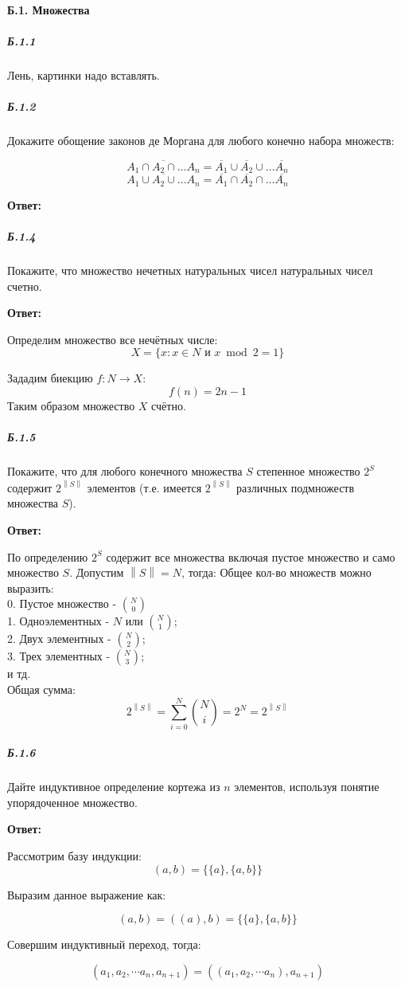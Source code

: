 \paragraph{Б.1. Множества}
\subparagraph{Б.1.1}
Лень, картинки надо вставлять.

\subparagraph{Б.1.2}

Докажите обощение законов де Моргана для любого конечно набора множеств:

\[
\overline{A_1 \cap A_2 \cap \ldots A_n } = \overline{A_1} \cup \overline{A_2} \cup \ldots \overline{A_n }
\]
\[
\overline{A_1 \cup A_2 \cup \ldots A_n } = \overline{A_1} \cap \overline{A_2} \cap \ldots \overline{A_n }
\]

\textbf{Ответ:}



\subparagraph{Б.1.4}

Покажите, что множество нечетных натуральных чисел натуральных чисел счетно.

\textbf{Ответ:}

Определим множество все нечётных числе:
\[
X = \{ x : x \in N  \text{ и } x \bmod 2 = 1 \}
\]

Зададим биекцию $f : N \rightarrow X$:
\[
f(n) = 2n - 1
\]
Таким образом множество $X$ счётно.

\subparagraph{Б.1.5}

Покажите, что для любого конечного множества $S$ степенное множество $2^S$ содержит $2^{\left\| S \right\|}$ элементов (т.е. имеется $2^{\left\| S \right\|}$ различных подмножеств множества $S$).

\textbf{Ответ:}

По определению $2^S$ содержит все множества включая пустое множество и само множество $S$. Допустим $\left\| S \right\| = N$, тогда:
Общее кол-во множеств можно выразить:\\
0. Пустое множество - $\binom{N}{0}$ \\
1. Одноэлементных - $N$ или $\binom{N}{1}$; \\
2. Двух элементных - $\binom{N}{2}$; \\
3. Трех элементных - $\binom{N}{3}$; \\
и тд. \\
Общая сумма: \\
\[
2^{\left\| S \right\|} = \sum_{i = 0}^{N} {\binom{N}{i}} = 2^N = 2^{\left\| S \right\|}
\]

\subparagraph{Б.1.6}

Дайте индуктивное определение кортежа из $n$ элементов, используя понятие упорядоченное множество.

\textbf{Ответ:}

Рассмотрим базу индукции:
\[
(a, b) = \{\{a\}, \{a, b\}\}
\]

Выразим данное выражение как:

\[
(a, b) = ((a), b) = \{\{a\}, \{a, b\}\}
\]

Совершим индуктивный переход, тогда:

\[
(a_1, a_2, \cdots a_n, a_{n+1}) = ((a_1, a_2, \cdots a_n), a_{n+1})
\]
